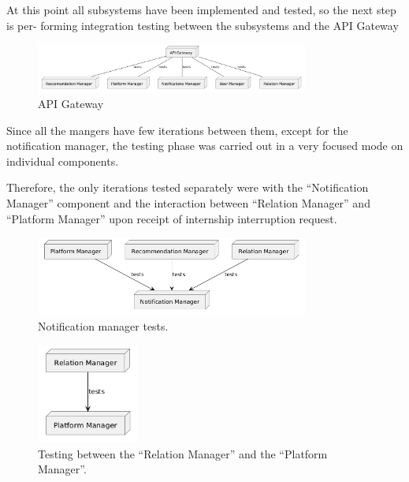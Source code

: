 At this point all subsystems have been implemented and tested, so the next step is per-
forming integration testing between the subsystems and the API Gateway

\begin{figure}[H]
    \centering
    \includegraphics[width=0.8\textwidth]{dd/assets/componen-itntegration-diagram/api-gateway.png}
    \caption{API Gateway}
    \label{fig:API Gateway}
\end{figure}

Since all the mangers have few iterations between them, except for the notification manager, the testing phase was carried out in a very focused mode on individual components.

Therefore, the only iterations tested separately were with the “Notification Manager” component and the interaction between “Relation Manager” and “Platform Manager” upon receipt of internship interruption request.

\begin{figure}[H]
    \centering
    \includegraphics[width=0.8\textwidth]{dd/assets/componen-itntegration-diagram/tests/1-notification-test.png}
    \caption{Notification manager tests.}
    \label{fig:Notification manager tests}
\end{figure}

\begin{figure}[H]
    \centering
    \includegraphics[width=0.3\textwidth]{dd/assets/componen-itntegration-diagram/tests/2-relation-platform.png}
    \caption{Testing between the “Relation Manager” and the “Platform Manager”.}
    \label{fig:Testing between the “Relation Manager” and the “Platform Manager”}
\end{figure}

\pagebreak
